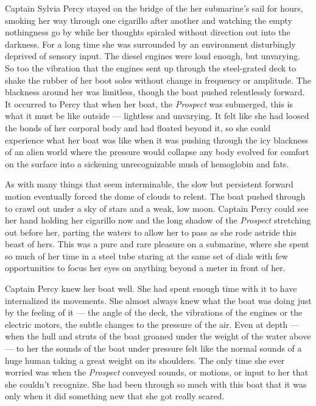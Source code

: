 \documentclass[]{article}
\begin{document}
\begin{multicols}{2}
Captain Sylvia Percy stayed on the bridge of the her submarine's sail
for hours, smoking her way through one cigarillo after another and
watching the empty nothingness go by while her thoughts spiraled without
direction out into the darkness. For a long time she was surrounded by
an environment disturbingly deprived of sensory input. The diesel
engines were loud enough, but unvarying. So too the vibration that the
engines sent up through the steel-grated deck to shake the rubber of her
boot soles without change in frequency or amplitude. The blackness
around her was limitless, though the boat pushed relentlessly forward.
It occurred to Percy that when her boat, the \emph{Prospect} was
submerged, this is what it must be like outside --- lightless and
unvarying. It felt like she had loosed the bonds of her corporal body
and had floated beyond it, so she could experience what her boat was
like when it was pushing through the icy blackness of an alien world
where the pressure would collapse any body evolved for comfort on the
surface into a sickening unrecognizable mush of hemoglobin and fats.

As with many things that seem interminable, the slow but persistent
forward motion eventually forced the dome of clouds to relent. The boat
pushed through to crawl out under a sky of stars and a weak, low moon.
Captain Percy could see her hand holding her cigarillo now and the long
shadow of the \emph{Prospect} stretching out before her, parting the
waters to allow her to pass as she rode astride this beast of hers. This
was a pure and rare pleasure on a submarine, where she spent so much of
her time in a steel tube staring at the same set of dials with few
opportunities to focus her eyes on anything beyond a meter in front of
her.

Captain Percy knew her boat well. She had spent enough time with it to
have internalized its movements. She almost always knew what the boat
was doing just by the feeling of it --- the angle of the deck, the
vibrations of the engines or the electric motors, the subtle changes to
the pressure of the air. Even at depth --- when the hull and struts of
the boat groaned under the weight of the water above --- to her the
sounds of the boat under pressure felt like the normal sounds of a huge
human taking a great weight on its shoulders. The only time she ever
worried was when the \emph{Prospect} conveyed sounds, or motions, or
input to her that she couldn't recognize. She had been through so much
with this boat that it was only when it did something new that she got
really scared.


\end{multicols}
\end{document}
